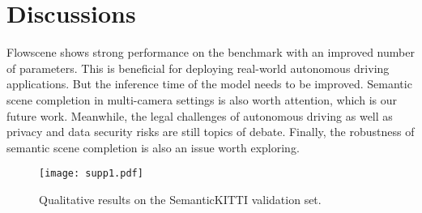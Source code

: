\section{Discussions}
\label{sec:limit}
Flowscene shows strong performance on the benchmark with an improved number of parameters. This is beneficial for deploying real-world autonomous driving applications. But the inference time of the model needs to be improved. Semantic scene completion in multi-camera settings is also worth attention, which is our future work. Meanwhile, the legal challenges of autonomous driving as well as privacy and data security risks are still topics of debate. Finally, the robustness of semantic scene completion is also an issue worth exploring.

\begin{figure*}[t]
\centering
  \texttt{[image: supp1.pdf]}
  \caption{Qualitative results on the SemanticKITTI validation set.}
  \label{fig:sup2}
\end{figure*}
